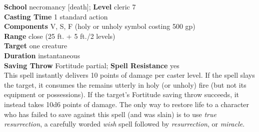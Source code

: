 \textbf{School }necromancy [death]; \textbf{Level} cleric 7\\
\textbf{Casting Time} 1 standard action\\
\textbf{Components} V, S, F (holy or unholy symbol costing 500 gp)\\
\textbf{Range }close (25 ft. + 5 ft./2 levels)\\
\textbf{Target} one creature\\
\textbf{Duration} instantaneous\\
\textbf{Saving Throw} Fortitude partial; \textbf{Spell Resistance} yes\\
This spell instantly delivers 10 points of damage per caster level. If the spell slays the target, it consumes the remains utterly in holy (or unholy) fire (but not its equipment or possessions). If the target's Fortitude saving throw succeeds, it instead takes 10d6 points of damage. The only way to restore life to a character who has failed to save against this spell (and was slain) is to use \textit{true resurrection}, a carefully worded \textit{wish} spell followed by \textit{resurrection}, or \textit{miracle}.\\
